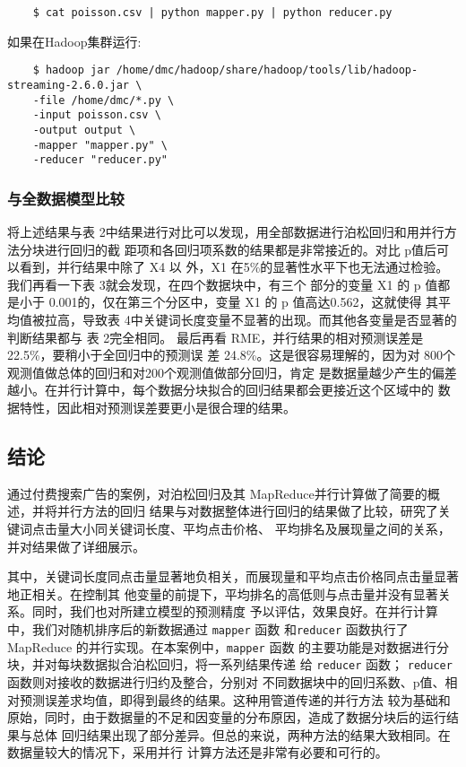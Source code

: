\begin{lstlisting}
	$ cat poisson.csv | python mapper.py | python reducer.py
\end{lstlisting}
如果在Hadoop集群运行:

\begin{lstlisting}
	$ hadoop jar /home/dmc/hadoop/share/hadoop/tools/lib/hadoop-streaming-2.6.0.jar \
	-file /home/dmc/*.py \
	-input poisson.csv \
	-output output \
	-mapper "mapper.py" \
	-reducer "reducer.py"
\end{lstlisting}


\subsubsection{与全数据模型比较}\label{ux4e0eux5168ux6570ux636eux6a21ux578bux6bd4ux8f83}

将上述结果与表 2中结果进行对比可以发现，用全部数据进行泊松回归和用并行方法分块进行回归的截
距项和各回归项系数的结果都是非常接近的。对比 p值后可以看到，并行结果中除了 X4 以
外，X1 在5\%的显著性水平下也无法通过检验。我们再看一下表 3就会发现，在四个数据块中，有三个
部分的变量 X1 的 p 值都是小于 0.001的，仅在第三个分区中，变量 X1 的 p 值高达0.562，这就使得
其平均值被拉高，导致表 4中关键词长度变量不显著的出现。而其他各变量是否显著的判断结果都与
表 2完全相同。 最后再看 RME，并行结果的相对预测误差是22.5\%，要稍小于全回归中的预测误
差 24.8\%。这是很容易理解的，因为对 800个观测值做总体的回归和对200个观测值做部分回归，肯定
是数据量越少产生的偏差越小。在并行计算中，每个数据分块拟合的回归结果都会更接近这个区域中的
数据特性，因此相对预测误差要更小是很合理的结果。

\subsection{结论}\label{ux7ed3ux8bba}

通过付费搜索广告的案例，对泊松回归及其 MapReduce并行计算做了简要的概述，并将并行方法的回归
结果与对数据整体进行回归的结果做了比较，研究了关键词点击量大小同关键词长度、平均点击价格、
平均排名及展现量之间的关系，并对结果做了详细展示。

其中，关键词长度同点击量显著地负相关，而展现量和平均点击价格同点击量显著地正相关。在控制其
他变量的前提下，平均排名的高低则与点击量并没有显著关系。同时，我们也对所建立模型的预测精度
予以评估，效果良好。在并行计算中，我们对随机排序后的新数据通过 \lstinline!mapper! 函数
和\lstinline!reducer! 函数执行了 MapReduce 的并行实现。在本案例中，\lstinline!mapper! 函数
的主要功能是对数据进行分块，并对每块数据拟合泊松回归，将一系列结果传递
给 \lstinline!reducer! 函数； \lstinline!reducer! 函数则对接收的数据进行归约及整合，分别对
不同数据块中的回归系数、p值、相对预测误差求均值，即得到最终的结果。这种用管道传递的并行方法
较为基础和原始，同时，由于数据量的不足和因变量的分布原因，造成了数据分块后的运行结果与总体
回归结果出现了部分差异。但总的来说，两种方法的结果大致相同。在数据量较大的情况下，采用并行
计算方法还是非常有必要和可行的。

